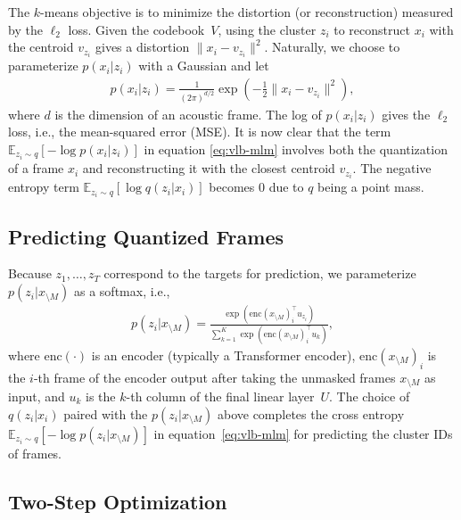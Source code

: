 The $k$-means objective is to minimize the distortion (or reconstruction) measured by the $\ell_2$ loss.
Given the codebook~$V$, using the cluster $z_i$ to reconstruct $x_i$ with the centroid $v_{z_i}$ gives a distortion $\|x_i - v_{z_i}\|^2$.
Naturally, we choose to parameterize $p(x_i|z_i)$ with a Gaussian and let
\begin{align}
p(x_i|z_i) = \frac{1}{(2\pi)^{d/2}}\exp\left(-\frac{1}{2}\|x_{i} - v_{z_{i}}\|^2\right),
\label{eq:rec}
\end{align}
where $d$ is the dimension of an acoustic frame.
The log of $p(x_i | z_i)$ gives the $\ell_2$ loss, i.e., the mean-squared error (MSE).
It is now clear that the term $\mathbb{E}_{z_i \sim q}[-\log p(x_i | z_i)]$ in equation \ref{eq:vlb-mlm} involves both the quantization of a frame $x_i$ and reconstructing it with the closest centroid $v_{z_i}$.
The negative entropy term $\mathbb{E}_{z_i \sim q}[\log q(z_i|x_i)]$ becomes 0 due to $q$ being a point mass.

\subsection{Predicting Quantized Frames}

Because $z_1, \dots, z_T$ correspond to the targets for prediction, we parameterize $p(z_i|x_{\setminus M})$
as a softmax, i.e.,
\begin{align}
p(z_i|x_{\setminus M}) = 
  \frac{\exp\left(\mathrm{enc}(x_{\setminus M})_i^\top u_{z_{i}}\right)}
    {\sum_{k=1}^K \exp\left(\mathrm{enc}(x_{\setminus M})_i^\top u_k\right)},
\label{eq:prior}
\end{align}
where $\mathrm{enc}(\cdot)$ is an encoder (typically a Transformer encoder),
%
$\mathrm{enc}(x_{\setminus M})_i$ is the $i$-th frame of the encoder output after taking the unmasked frames $x_{\setminus M}$ as input, and $u_k$ is the $k$-th column of the final linear layer~$U$.
The choice of $q(z_i|x_i)$ paired with the $p(z_i | x_{\setminus M})$ above completes the cross entropy $\mathbb{E}_{z_i \sim q}[-\log p(z_i | x_{\setminus M})]$ in equation~\ref{eq:vlb-mlm} for predicting the cluster IDs of frames.

\subsection{Two-Step Optimization}
\label{sec:optimization}

